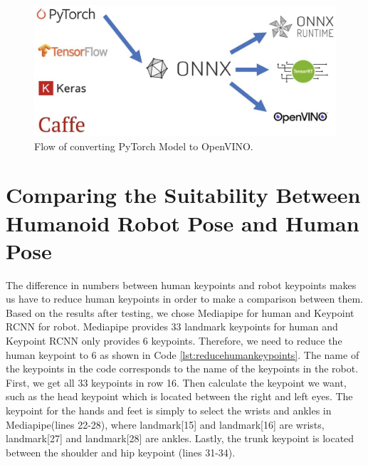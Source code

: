 \begin{figure}[ht]
  \centering
  \includegraphics[scale=0.4]{gambar/pytorch-onnx-openvino.jpg}
  \caption{Flow of converting PyTorch Model to OpenVINO.}
  \label{fig:pytorch-to-openvino}
\end{figure}


\section{Comparing the Suitability Between Humanoid Robot Pose and Human Pose}
\label{sec:comparingsuitability}

The difference in numbers between human keypoints and robot keypoints makes us have to reduce human keypoints in order to make a comparison between them.
Based on the results after testing, we chose Mediapipe for human and Keypoint RCNN for robot. Mediapipe provides 33 landmark keypoints for human and Keypoint RCNN only provides 6 keypoints.
Therefore, we need to reduce the human keypoint to 6 as shown in Code \ref{lst:reducehumankeypoints}.
The name of the keypoints in the code corresponds to the name of the keypoints in the robot. First, we get all 33 keypoints in row 16. Then calculate the keypoint we want, such as the head keypoint which is located between the right and left eyes.
The keypoint for the hands and feet is simply to select the wrists and ankles in Mediapipe(lines 22-28), where landmark[15] and landmark[16] are wrists, landmark[27] and landmark[28] are ankles. Lastly, the trunk keypoint is located between the shoulder and hip keypoint (lines 31-34).



